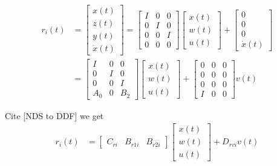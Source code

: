 \documentclass[twocolumn]{autart}    %
\begin{document}
\begin{equation}
    \begin{aligned}
        r_{i}(t) &= \begin{bmatrix}
            x(t) \\
            z(t) \\
            y(t) \\
            \dot{x}(t)
        \end{bmatrix} = \begin{bmatrix}
            I & 0 & 0 \\
            0 & I & 0  \\
            0 & 0 & I  \\
            0 & 0 & 0 
        \end{bmatrix}\begin{bmatrix}
            x(t) \\
            w(t) \\
            u(t) 
        \end{bmatrix}+\begin{bmatrix}
            0 \\
            0 \\
            0 \\
            \dot{x}(t)
        \end{bmatrix}\\
        &= \begin{bmatrix}
            I & 0 & 0 \\
            0 & I & 0  \\
            0 & 0 & I  \\
            A_{0} & 0 & B_{2} 
        \end{bmatrix}\begin{bmatrix}
            x(t) \\
            w(t) \\
            u(t) 
        \end{bmatrix}+\begin{bmatrix}
            0 & 0 & 0 \\
            0 & 0 & 0\\
            0 & 0 & 0\\
            I & 0 & 0
        \end{bmatrix}v(t)
    \end{aligned}
\end{equation}

Cite [NDS to DDF] we get
\begin{equation}
    \begin{aligned}
            r_{i}(t) & = \begin{bmatrix}
            C_{ri} & B_{r1i} & B_{r2i}
        \end{bmatrix}\begin{bmatrix}
            x(t) \\
            w(t) \\
            u(t) 
        \end{bmatrix} 
        + D_{rvi}v(t)
    \end{aligned}
\end{equation}
\end{document}
